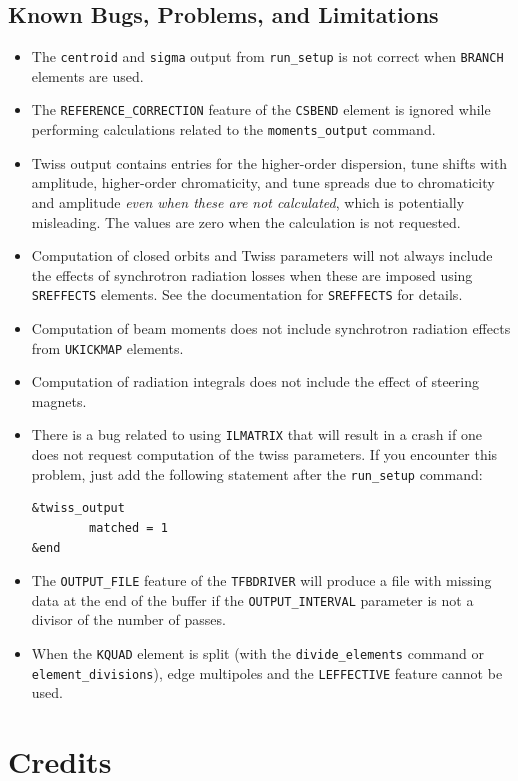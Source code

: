 \documentclass[11pt]{article}
\begin{document}
\subsection{Known Bugs, Problems, and Limitations}
\begin{itemize}
\item The \verb|centroid| and \verb|sigma| output from \verb|run_setup| is not correct when \verb|BRANCH| elements
  are used.
\item The \verb|REFERENCE_CORRECTION| feature of the \verb|CSBEND| element is ignored while performing calculations related
  to the \verb|moments_output| command.
\item Twiss output contains entries for the higher-order dispersion, tune shifts with amplitude, higher-order chromaticity, and tune spreads
  due to chromaticity and amplitude {\em even when these are not calculated}, which is potentially
  misleading.   The values are zero when the calculation is not requested.
\item Computation of closed orbits and Twiss parameters will not always include the effects of synchrotron
  radiation losses when these are imposed using {\tt SREFFECTS} elements.  See
  the documentation for {\tt SREFFECTS} for details.
\item Computation of beam moments does not include synchrotron radiation effects from \verb|UKICKMAP| elements.
\item Computation of radiation integrals does not include the effect of steering magnets.
\item There is a bug related to using {\tt ILMATRIX} that will result in a crash
  if one does not request computation of the twiss parameters. If you encounter this
  problem, just add the following statement after the \verb|run_setup| command:
\begin{verbatim}
&twiss_output
        matched = 1
&end
\end{verbatim}
\item The \verb|OUTPUT_FILE| feature of the \verb|TFBDRIVER| will produce a file with missing data at the end of
  the buffer if the \verb|OUTPUT_INTERVAL| parameter is not a divisor of the number of passes.
\item When the \verb|KQUAD| element is split (with the \verb|divide_elements| command or
  \verb|element_divisions|), edge multipoles and the \verb|LEFFECTIVE| feature cannot be used.
\end{itemize}

\section{Credits}
\end{document}
